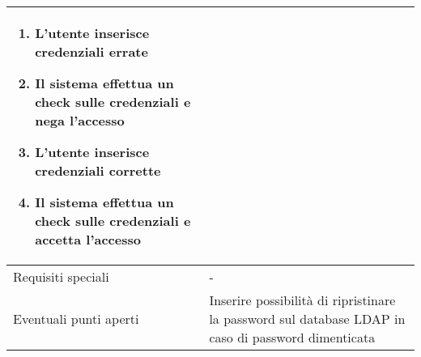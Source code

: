 \documentclass[../../main.tex]{subfiles}
\begin{document}
\begin{tabularx}{\textwidth}{|l|X|}
{\begin{enumerate}
\item L'utente inserisce credenziali errate
\item Il sistema effettua un check sulle credenziali e nega l'accesso
\item L'utente inserisce credenziali corrette
\item Il sistema effettua un check sulle credenziali e accetta l'accesso
    \end{enumerate}}
    \\
    \hline
    Requisiti speciali                  & -   \\
    \hline
    Eventuali punti aperti              &    Inserire possibilità di ripristinare la password sul database LDAP in caso di password dimenticata \\
    \hline
\end{tabularx}
\vfill\newpage
\end{document}
